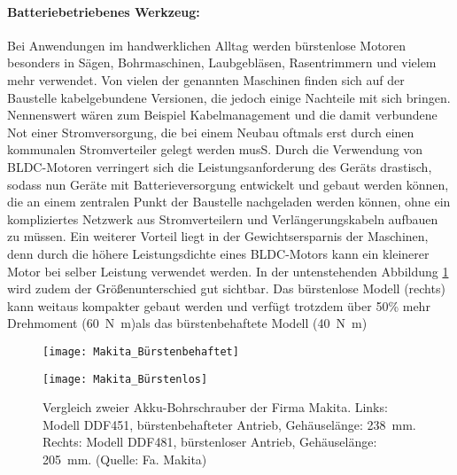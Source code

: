 \paragraph{Batteriebetriebenes Werkzeug:} Bei Anwendungen im handwerklichen Alltag werden bürstenlose Motoren besonders in Sägen, Bohrmaschinen, Laubgebläsen, Rasentrimmern und vielem mehr verwendet. Von vielen der genannten Maschinen finden sich auf der Baustelle kabelgebundene Versionen, die jedoch einige Nachteile mit sich bringen. Nennenswert wären zum Beispiel Kabelmanagement und die damit verbundene Not einer Stromversorgung, die bei einem Neubau oftmals erst durch einen kommunalen Stromverteiler gelegt werden musS.  Durch die Verwendung von BLDC-Motoren verringert sich die Leistungsanforderung des Geräts drastisch, sodass nun Geräte mit Batterieversorgung entwickelt und gebaut werden können, die an einem zentralen Punkt der Baustelle nachgeladen werden können, ohne ein kompliziertes Netzwerk aus Stromverteilern und Verlängerungskabeln aufbauen zu müssen. Ein weiterer Vorteil liegt in der Gewichtsersparnis der Maschinen, denn durch die höhere Leistungsdichte eines BLDC-Motors kann ein kleinerer Motor bei selber Leistung verwendet werden. In der untenstehenden Abbildung \ref{fig:Vergleich} wird zudem der Größenunterschied gut sichtbar. Das bürstenlose Modell (rechts) kann weitaus kompakter gebaut werden und verfügt trotzdem über 50\% mehr Drehmoment (\SI{60}{\newton\meter})als das bürstenbehaftete Modell (\SI{40}{\newton\meter})

\begin{figure}[H]
  \centering
  \begin{minipage}{.49\textwidth}
    \centering
    \texttt{[image: Makita\_Bürstenbehaftet]}
  \end{minipage}\hfill%
  \begin{minipage}{.49\textwidth}
    \centering
    \texttt{[image: Makita\_Bürstenlos]}
  \end{minipage}
  \caption[Vergleich Akkubohrschrauber]{Vergleich zweier Akku-Bohrschrauber der Firma Makita. Links: Modell DDF451, bürstenbehafteter Antrieb, Gehäuselänge: \SI{238}{\milli\meter}. Rechts: Modell DDF481, bürstenloser Antrieb, Gehäuselänge: \SI{205}{\milli\meter}. (Quelle: Fa. Makita)}
  \label{fig:Vergleich}
\end{figure}

